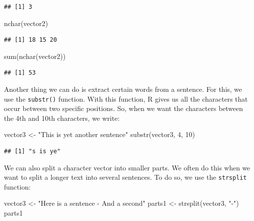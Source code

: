 \documentclass[
]{article}
\newenvironment{Shaded}{\begin{snugshade}}{\end{snugshade}}
\newcommand{\DecValTok}[1]{\textcolor[rgb]{0.00,0.00,0.81}{#1}}
\newcommand{\FunctionTok}[1]{\textcolor[rgb]{0.00,0.00,0.00}{#1}}
\newcommand{\NormalTok}[1]{#1}
\newcommand{\OtherTok}[1]{\textcolor[rgb]{0.56,0.35,0.01}{#1}}
\newcommand{\StringTok}[1]{\textcolor[rgb]{0.31,0.60,0.02}{#1}}
\begin{document}
\begin{verbatim}
## [1] 3
\end{verbatim}

\begin{Shaded}
\begin{Highlighting}[]
\FunctionTok{nchar}\NormalTok{(vector2)}
\end{Highlighting}
\end{Shaded}

\begin{verbatim}
## [1] 18 15 20
\end{verbatim}

\begin{Shaded}
\begin{Highlighting}[]
\FunctionTok{sum}\NormalTok{(}\FunctionTok{nchar}\NormalTok{(vector2))}
\end{Highlighting}
\end{Shaded}

\begin{verbatim}
## [1] 53
\end{verbatim}

Another thing we can do is extract certain words from a sentence. For this, we use the \texttt{substr()} function. With this function, R gives us all the characters that occur between two specific positions. So, when we want the characters between the 4th and 10th characters, we write:

\begin{Shaded}
\begin{Highlighting}[]
\NormalTok{vector3 }\OtherTok{\textless{}{-}} \StringTok{"This is yet another sentence"}
\FunctionTok{substr}\NormalTok{(vector3, }\DecValTok{4}\NormalTok{, }\DecValTok{10}\NormalTok{)}
\end{Highlighting}
\end{Shaded}

\begin{verbatim}
## [1] "s is ye"
\end{verbatim}

We can also split a character vector into smaller parts. We often do this when we want to split a longer text into several sentences. To do so, we use the \texttt{strsplit} function:

\begin{Shaded}
\begin{Highlighting}[]
\NormalTok{vector3 }\OtherTok{\textless{}{-}} \StringTok{"Here is a sentence {-} And a second"}
\NormalTok{parts1 }\OtherTok{\textless{}{-}} \FunctionTok{strsplit}\NormalTok{(vector3, }\StringTok{"{-}"}\NormalTok{)}
\NormalTok{parts1}
\end{Highlighting}
\end{Shaded}
\end{document}
